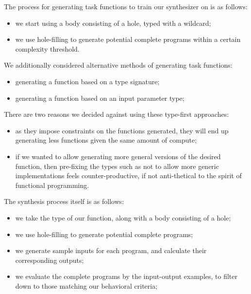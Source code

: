 \documentclass{article}
\begin{document}
The process for generating task functions to train our synthesizer on is as follows:
\begin{itemize}
    \item we start using a body consisting of a hole, typed with a wildcard;
    \item we use hole-filling to generate potential complete programs within a certain complexity threshold.
\end{itemize}

We additionally considered alternative methods of generating task functions:
\begin{itemize}
    \item generating a function based on a type signature;
    \item generating a function based on an input parameter type; %
\end{itemize}
There are two reasons we decided against using these type-first approaches:
\begin{itemize}
    \item as they impose constraints on the functions generated, they will end up generating less functions given the same amount of compute;
    \item if we wanted to allow generating more general versions of the desired function, then pre-fixing the types such as not to allow more generic implementations feels counter-productive, if not anti-thetical to the spirit of functional programming.
\end{itemize}

The synthesis process itself is as follows:
\begin{itemize}
    \item we take the type of our function, along with a body consisting of a hole;
    \item we use hole-filling to generate potential complete programs;
    \item we generate sample inputs for each program, and calculate their corresponding outputs;
    \item we evaluate the complete programs by the input-output examples, to filter down to those matching our behavioral criteria;
\end{itemize}
\end{document}
